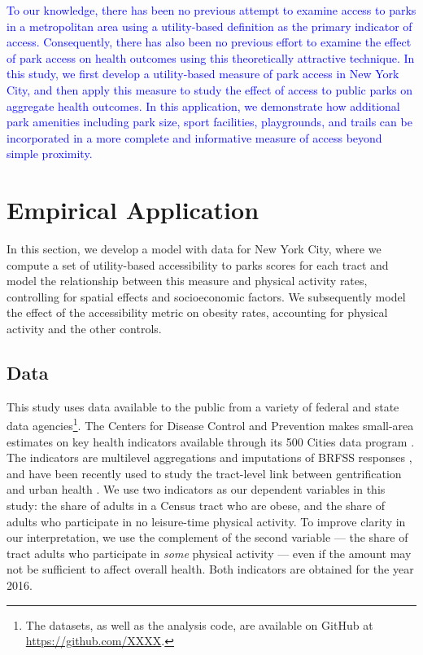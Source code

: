 \documentclass[shortAfour,sageh.bst]{sagej}
\begin{document}
\textcolor{blue}{To our knowledge, there has been no previous attempt to examine access
to parks in a metropolitan area using a utility-based definition as the
primary indicator of access. Consequently, there has also been no
previous effort to examine the effect of park access on health outcomes
using this theoretically attractive technique. In this study, we first
develop a utility-based measure of park access in New York City, and
then apply this measure to study the effect of access to public parks on
aggregate health outcomes. In this application, we demonstrate how additional
park amenities including park size, sport facilities, playgrounds, and trails 
can be incorporated in a more complete and informative measure of access beyond simple proximity.}

\hypertarget{empirical-application}{%
\section{Empirical Application}\label{empirical-application}}

In this section, we develop a model with data for New York City, where
we compute a set of utility-based accessibility to parks scores for each
tract and model the relationship between this measure and physical
activity rates, controlling for spatial effects and socioeconomic
factors. We subsequently model the effect of the accessibility metric on
obesity rates, accounting for physical activity and the other controls.

\hypertarget{data}{%
\subsection{Data}\label{data}}

This study uses data available to the public from a variety of federal
and state data agencies\footnote{The datasets, as well as the analysis
  code, are available on GitHub at
  \url{https://github.com/XXXX}.}. The Centers
for Disease Control and Prevention makes small-area estimates on key
health indicators available through its 500 Cities data program
\citep{CDC5002016}. The indicators are multilevel aggregations and
imputations of BRFSS responses \citep{Wang2018, Wang2017}, and have been
recently used to study the tract-level link between gentrification and
urban health \citep{Gibbons2018}. We use two indicators as our dependent
variables in this study: the share of adults in a Census tract who are
obese, and the share of adults who participate in no leisure-time
physical activity. To improve clarity in our interpretation, we use the
complement of the second variable --- the share of tract adults who
participate in \emph{some} physical activity --- even if the amount may
not be sufficient to affect overall health. Both indicators are obtained
for the year 2016.
\end{document}
